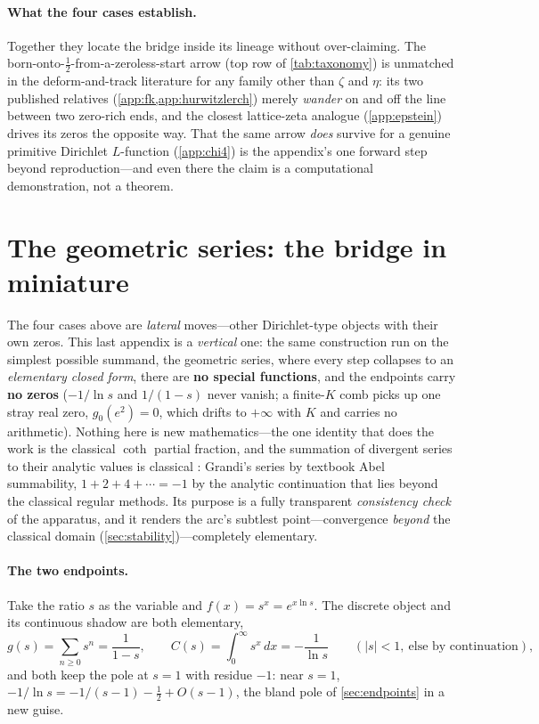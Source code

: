 \documentclass[11pt]{article}
\theoremstyle{definition}
\begin{document}
\paragraph{What the four cases establish.}
Together they locate the bridge inside its lineage without over-claiming. The
born-onto-$\tfrac12$-from-a-zeroless-start arrow (top row of \cref{tab:taxonomy}) is
unmatched in the deform-and-track literature for any family other than $\zeta$ and
$\eta$: its two published relatives (\cref{app:fk,app:hurwitzlerch}) merely
\emph{wander} on and off the line between two zero-rich ends, and the closest
lattice-zeta analogue (\cref{app:epstein}) drives its zeros the opposite way. That the
same arrow \emph{does} survive for a genuine primitive Dirichlet $L$-function
(\cref{app:chi4}) is the appendix's one forward step beyond reproduction---and even
there the claim is a computational demonstration, not a theorem.

\section{The geometric series: the bridge in miniature}\label{app:geometric}

The four cases above are \emph{lateral} moves---other Dirichlet-type objects with
their own zeros. This last appendix is a \emph{vertical} one: the same construction
run on the simplest possible summand, the geometric series, where every step collapses
to an \emph{elementary closed form}, there are \textbf{no special functions}, and the
endpoints carry \textbf{no zeros} ($-1/\ln s$ and $1/(1-s)$ never vanish; a finite-$K$
comb picks up one stray real zero, $g_0(e^2)=0$, which drifts to $+\infty$ with $K$ and
carries no arithmetic). Nothing here is new mathematics---the one identity that does the
work is the classical $\coth$ partial fraction, and the summation of divergent series to
their analytic values is classical \citep[cf.][]{Hardy1949}: Grandi's series by textbook
Abel summability, $1+2+4+\cdots=-1$ by the analytic continuation that lies beyond the
classical regular methods. Its
purpose is a fully transparent \emph{consistency check} of the apparatus, and it renders
the arc's subtlest point---convergence \emph{beyond} the classical domain
(\cref{sec:stability})---completely elementary.

\paragraph{The two endpoints.}
Take the ratio $s$ as the variable and $f(x)=s^{x}=e^{x\ln s}$. The discrete object and
its continuous shadow are both elementary,
\begin{equation}\label{eq:geom-endpoints}
  g(s)=\sum_{n\ge0}s^{n}=\frac{1}{1-s},
  \qquad
  C(s)=\int_0^{\infty}s^{x}\,dx=-\frac{1}{\ln s}
  \qquad(|s|<1,\ \text{else by continuation}),
\end{equation}
and both keep the pole at $s=1$ with residue $-1$: near $s=1$,
$-1/\ln s=-1/(s-1)-\tfrac12+O(s-1)$, the bland pole of \cref{sec:endpoints} in a new
guise.
\end{document}
